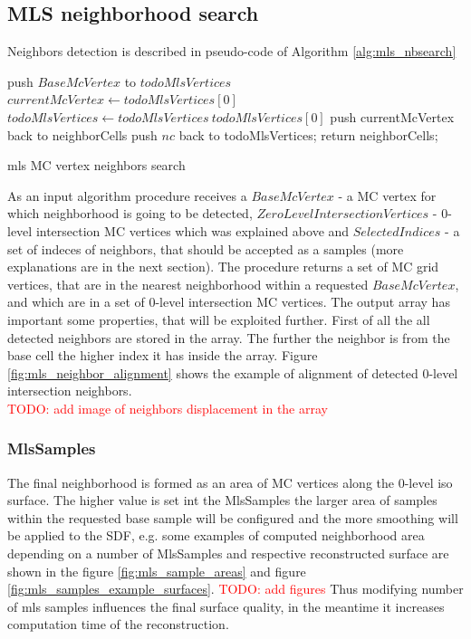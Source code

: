 \subsection{MLS neighborhood search}
Neighbors detection is described in pseudo-code of Algorithm \ref{alg:mls_nbsearch}
\begin{algorithm}[H]
	\scriptsize
	\begin{algorithmic}
		\State push $BaseMcVertex$ to $todoMlsVertices$
			\State $currentMcVertex \gets todoMlsVertices[0]$
			\State $todoMlsVertices \gets todoMlsVertices \ todoMlsVertices[0]$
				\State push currentMcVertex back to neighborCells
			\EndIf
					\State push $nc$ back to todoMlsVertices;
				\EndIf
			\EndFor
		\EndWhile
		return neighborCells;
	\end{algorithmic}
	\caption{mls MC vertex neighbors search}
	\label{alg:mls_nbsearch}
\end{algorithm}
As an input algorithm procedure receives a  $BaseMcVertex$ - a MC vertex for which neighborhood is going to be detected, $ZeroLevelIntersectionVertices$ - 0-level intersection MC vertices which was explained above and $SelectedIndices$ - a set of indeces of neighbors, that should be accepted as a samples (more explanations are in the next section). The procedure returns a set of MC grid vertices, that are in the nearest neighborhood within a requested $BaseMcVertex$, and which are in a set of 0-level intersection MC vertices. The output array has important some properties, that will be exploited further. First of all the all detected neighbors are stored in the array. The further the neighbor is from the base cell the higher index it has inside the array. Figure \ref{fig:mls_neighbor_alignment} shows the example of alignment of detected 0-level intersection neighbors.\\
\textcolor{red}{TODO: add image of neighbors displacement in the array}
\subsubsection{MlsSamples}
The final neighborhood is formed as an area of MC vertices along the 0-level iso surface. The higher value is set int the MlsSamples the larger area of samples within the requested base sample will be configured and the more smoothing will be applied to the SDF, e.g. some examples of computed neighborhood area depending on a number of MlsSamples and respective reconstructed surface are shown in the figure \ref{fig:mls_sample_areas} and figure \ref{fig:mls_samples_example_surfaces}.
\textcolor{red}{TODO: add figures}
Thus modifying number of mls samples influences the final surface quality, in the meantime it increases computation time of the reconstruction.
